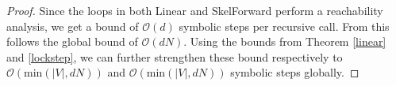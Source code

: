 \documentclass[../master/master.tex]{subfiles}
\begin{document}
\begin{proof}
  Since the loops in both Linear and SkelForward perform a reachability analysis, we get a bound of $\mathcal{O}(d)$ symbolic steps per recursive call. From this follows the global bound of $\mathcal{O}(dN)$. Using the bounds from Theorem \ref{linear} and \ref{lockstep}, we can further strengthen these bound respectively to $\mathcal{O}(\text{min}(|V|, dN))$ and $\mathcal{O}(\text{min}(|V|, dN))$ symbolic steps globally.
\end{proof}
\end{document}
